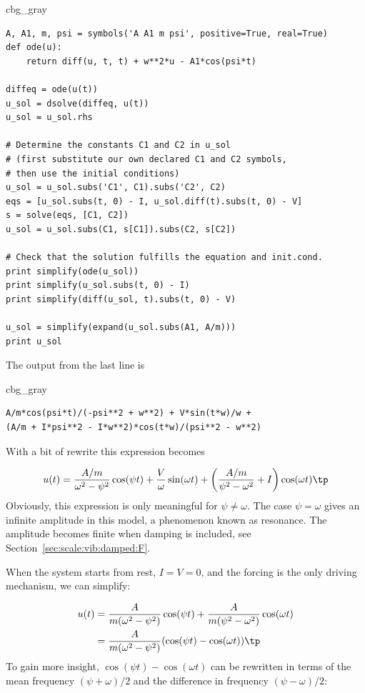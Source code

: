 \documentclass[graybox,envcountchap,sectrefs,final]{svmonodo}
\newenvironment{_cod_tight}[1]{
   \def\FrameCommand{\colorbox{#1}}
   \FrameRule0.6pt\MakeFramed {\FrameRestore}\vskip3mm}
   {\vskip0mm\endMakeFramed}
\newenvironment{cod}[1]{
\bgroup\rmfamily
\fboxsep=0mm\relax
\begin{_cod_tight}{#1}
\list{}{\parsep=-2mm\parskip=0mm\topsep=0pt\leftmargin=2mm
\rightmargin=2\leftmargin\leftmargin=4pt\relax}
\item\relax}
{\endlist\end{_cod_tight}\egroup}
\begin{document}
\begin{cod}{cbg_gray}\begin{Verbatim}[numbers=none,fontsize=\fontsize{9pt}{9pt},baselinestretch=0.95,xleftmargin=2mm]
A, A1, m, psi = symbols('A A1 m psi', positive=True, real=True)
def ode(u):
    return diff(u, t, t) + w**2*u - A1*cos(psi*t)

diffeq = ode(u(t))
u_sol = dsolve(diffeq, u(t))
u_sol = u_sol.rhs

# Determine the constants C1 and C2 in u_sol
# (first substitute our own declared C1 and C2 symbols,
# then use the initial conditions)
u_sol = u_sol.subs('C1', C1).subs('C2', C2)
eqs = [u_sol.subs(t, 0) - I, u_sol.diff(t).subs(t, 0) - V]
s = solve(eqs, [C1, C2])
u_sol = u_sol.subs(C1, s[C1]).subs(C2, s[C2])

# Check that the solution fulfills the equation and init.cond.
print simplify(ode(u_sol))
print simplify(u_sol.subs(t, 0) - I)
print simplify(diff(u_sol, t).subs(t, 0) - V)

u_sol = simplify(expand(u_sol.subs(A1, A/m)))
print u_sol
\end{Verbatim}
\end{cod}
\noindent
The output from the last line is

\begin{cod}{cbg_gray}\begin{Verbatim}[numbers=none,fontsize=\fontsize{9pt}{9pt},baselinestretch=0.95,xleftmargin=2mm]
A/m*cos(psi*t)/(-psi**2 + w**2) + V*sin(t*w)/w +
(A/m + I*psi**2 - I*w**2)*cos(t*w)/(psi**2 - w**2)
\end{Verbatim}
\end{cod}
\noindent
With a bit of rewrite this expression becomes


\[ u(t) = \frac{A/m}{\omega^2 - \psi^2}\cos(\psi t) + \frac{V}{\omega}
   \sin(\omega t) +
\left(\frac{A/m}{\psi^2 - \omega^2} + I\right) \cos (\omega t)\tp
\]
Obviously, this expression is only meaningful for $\psi\neq\omega$. The
case $\psi = \omega$ gives an infinite amplitude in this model, a
phenomenon known as resonance. The amplitude becomes finite when
damping is included,
see Section~\ref{sec:scale:vib:damped:F}.

When the system starts from rest, $I=V=0$, and the
forcing is the only driving mechanism, we can simplify:

\begin{align*}
u(t) &= \frac{A}{m(\omega^2 - \psi^2)}\cos(\psi t)
+
\frac{A}{m(\psi^2 - \omega^2)}\cos (\omega t)\\ 
&= \frac{A}{m(\omega^2 - \psi^2)}(\cos(\psi t) - \cos(\omega t))\tp
\end{align*}
To gain more insight, $\cos(\psi t) - \cos(\omega t)$ can be
rewritten in terms of the mean frequency $(\psi + \omega)/2$ and
the difference in frequency $(\psi - \omega)/2$:
\end{document}
